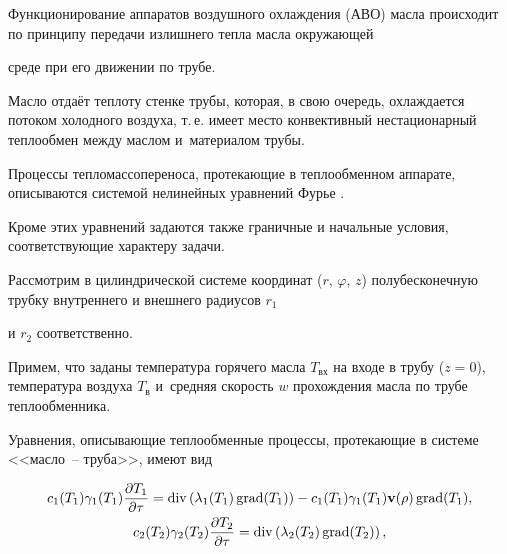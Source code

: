 \maketitle







Функционирование аппаратов воздушного охлаждения (АВО) масла происходит по принципу передачи излишнего тепла масла окружающей

среде при его движении по трубе. 

Масло отдаёт теплоту стенке трубы, которая, в свою очередь, охлаждается потоком холодного воздуха, т.\,е. имеет место конвективный нестационарный теплообмен между маслом и~материалом трубы.



Процессы тепломассопереноса, протекающие в теплообменном аппарате, описываются системой нелинейных уравнений Фурье \cite{kuzn:bib1}. 

Кроме этих уравнений задаются также граничные и начальные условия, соответствующие характеру задачи.



Рассмотрим в цилиндрической системе координат ($r$, $\varphi$, $z$) полубесконечную трубку внутреннего и внешнего радиусов $r_1$

и $r_2$ соответственно. 

Примем, что заданы температура горячего масла $T_\text{вх}$ на входе в трубу ($z = 0$), температура воздуха $T_\text{в}$ и~средняя скорость $w$ прохождения масла по трубе теплообменника.



Уравнения, описывающие теплообменные процессы, протекающие в системе <<масло~-- труба>>, имеют вид

\begin{gather}

\label{kuzn:eq1}

c_1 (T_1)\gamma _1 (T_1) \frac{\partial T_1}{\partial \tau }=\mathop{\rm div} \left(\lambda _1 (T_1) \mathop{\rm grad} (T_1)

\right) - c_1 (T_1) \gamma _1 (T_1) {\rm {\bf v}} ( {\rm {\bf \rho }}) \mathop{\rm grad} (T_1),\\

\label{kuzn:eq2}

c_2 (T_2)\gamma _2 (T_2) \frac{\partial T_2}{\partial \tau }= \mathop{\rm div} \left( \lambda _2 (T_2)\mathop{\rm grad}(T_2)\right),

\end{gather}

